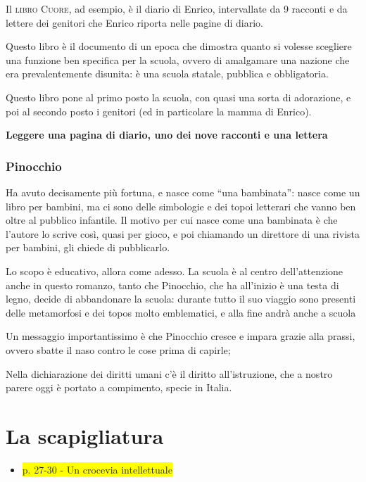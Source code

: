 \documentclass{book}
\newcommand{\pagine}[1]{\colorbox{yellow}{#1}}
\newcounter{mar}
\begin{document}
Il \textsc{libro Cuore}, ad esempio, è il diario di Enrico, intervallate
da 9 racconti e da lettere dei genitori che Enrico riporta nelle pagine
di diario.

Questo libro è il documento di un epoca che dimostra quanto si volesse
scegliere una funzione ben specifica per la scuola, ovvero di amalgamare
una nazione che era prevalentemente disunita: è una scuola statale,
pubblica e obbligatoria.

Questo libro pone al primo posto la scuola, con quasi una sorta di
adorazione, e poi al secondo posto i genitori (ed in particolare la
mamma di Enrico).

\textbf{Leggere una pagina di diario, uno dei nove racconti e una
lettera}

\subsection{Pinocchio}

Ha avuto decisamente più fortuna, e nasce come ``una bambinata'': nasce
come un libro per bambini, ma ci sono delle simbologie e dei topoi
letterari che vanno ben oltre al pubblico infantile. Il motivo per cui
nasce come una bambinata è che l'autore lo scrive così, quasi per gioco,
e poi chiamando un direttore di una rivista per bambini, gli chiede di
pubblicarlo.

Lo scopo è educativo, allora come adesso. La scuola è al centro
dell'attenzione anche in questo romanzo, tanto che Pinocchio, che ha
all'inizio è una testa di legno, decide di abbandonare la scuola:
durante tutto il suo viaggio sono presenti delle metamorfosi e dei topos
molto emblematici, e alla fine andrà anche a scuola

Un messaggio importantissimo è che Pinocchio cresce e impara grazie alla
prassi, ovvero sbatte il naso contro le cose prima di capirle;

Nella dichiarazione dei diritti umani c'è il diritto all'istruzione, che
a nostro parere oggi è portato a compimento, specie in Italia.

\chapter{La scapigliatura}

\begin{itemize}
\item
  \pagine{p. 27-30 - Un crocevia intellettuale}
\end{itemize}
\end{document}
